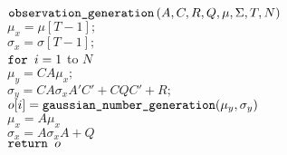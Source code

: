 \begin{algorithm}[h]
\begin{pseudocode}
\codename $\mbox{\texttt{observation\_generation}}\left(A,C,R,Q,\mu,\Sigma,T,N\right)$\\
\codeline $\mu_x = \mu[T-1];$\\
\codeline $\sigma_x = \sigma[T-1];$\\
\codeline $\mbox{\texttt{for }} i = 1$ to $N$\\
\codeline \> $\mu_y = C A \mu_x;$\\
\codeline \> $\sigma_y = CA \sigma_x A'C' + CQC' + R;$\\
\codeline \> $o[i] = \mbox{\texttt{gaussian\_number\_generation}}(\mu_y, \sigma_y)$\\
\codeline \> $\mu_x = A \mu_x$\\
\codeline \> $\sigma_x = A  \sigma_x A + Q$\\
\codeline $\mbox{\texttt{return }} o$
\end{pseudocode}
\end{algorithm}
